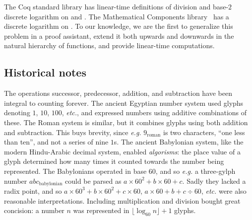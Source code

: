 \label{sec:related}

%

The Coq standard library has linear-time definitions
of division and base-$2$ discrete logarithm on  and .
The Mathematical Components library~\cite{MathComp}
has a discrete logarithm on .
To our knowledge, we are the first to generalize this
problem in a proof assistant, extend it both
upwards and downwards in the natural hierarchy of functions, and
provide linear-time computations.

\subsection{Historical notes}

The operations successor, predecessor, addition, and subtraction have
been integral to counting forever. The ancient Egyptian
number system used glyphs denoting $1$, $10$, $100$, \emph{etc.},
and expressed numbers using additive combinations of these.
The Roman system is similar, but
it combines glyphs using both addition and subtraction. This buys brevity,
since \emph{e.g.} $9_{\text{roman}}$ is two characters, ``one less than ten'',
and not a series of nine $1$s.
The ancient Babylonian system, like the modern Hindu-Arabic decimal system,
enabled \emph{algorisms}: the place value of a glyph determined how many times it
counted towards the number being represented.
The Babylonians operated in
base $60$, and so \emph{e.g.} a three-gylph number $abc_{\text{babylonian}}$ could
be parsed as $a \times 60^2 + b \times 60 + c$. Sadly they lacked
a radix point, and so
$a \times 60^3 + b \times 60^2 + c \times 60$, $a \times 60 + b + c \div 60$,
\emph{etc.} were also reasonable interpretations.
Including multiplication and division bought great concision: a number $n$ was
represented in $\lfloor \log_{60}n \rfloor + 1$ glyphs.


